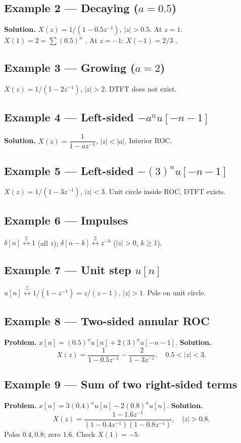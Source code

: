 \documentclass[11pt]{article}
\newcommand{\ZT}{\overset{\mathcal{Z}}{\longleftrightarrow}}
\begin{document}
\subsection{Example 2 --- Decaying ($a=0.5$)}
\textbf{Solution.} $X(z)=1/(1-0.5 z^{-1})$, $|z|>0.5$. At $z=1$: $X(1)=2=\sum(0.5)^n$ \checkmark. At $z=-1$: $X(-1)=2/3$ \checkmark.

\subsection{Example 3 --- Growing ($a=2$)}
$X(z)=1/(1-2z^{-1})$, $|z|>2$. DTFT does not exist.

\subsection{Example 4 --- Left-sided $-a^n u[-n-1]$}
\textbf{Solution.} $X(z)=\dfrac{1}{1-az^{-1}}$, $|z|<|a|$. Interior ROC.

\subsection{Example 5 --- Left-sided $-(3)^n u[-n-1]$}
$X(z)=1/(1-3z^{-1})$, $|z|<3$. Unit circle inside ROC, DTFT exists.

\subsection{Example 6 --- Impulses}
$\delta[n]\ZT 1$ (all $z$); $\delta[n-k]\ZT z^{-k}$ ($|z|>0$, $k\ge 1$).

\subsection{Example 7 --- Unit step $u[n]$}
$u[n]\ZT 1/(1-z^{-1})=z/(z-1)$, $|z|>1$. Pole on unit circle.

\subsection{Example 8 --- Two-sided annular ROC}
\textbf{Problem.} $x[n]=(0.5)^n u[n]+2(3)^n u[-n-1]$.
\textbf{Solution.}
\[X(z)=\frac{1}{1-0.5 z^{-1}}-\frac{2}{1-3z^{-1}},\quad 0.5<|z|<3.\]

\subsection{Example 9 --- Sum of two right-sided terms}
\textbf{Problem.} $x[n]=3(0.4)^n u[n]-2(0.8)^n u[n]$.
\textbf{Solution.}
\[X(z)=\frac{1-1.6z^{-1}}{(1-0.4 z^{-1})(1-0.8 z^{-1})},\quad|z|>0.8.\]
Poles $0.4,0.8$; zero $1.6$. Check $X(1)=-5$.
\end{document}

